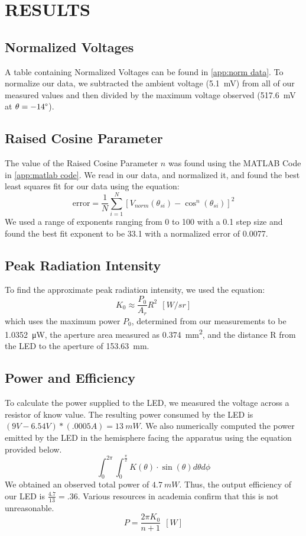 \section{RESULTS}

\subsection{Normalized Voltages}
A table containing Normalized Voltages can be found in \autoref{app:norm data}. To normalize our data, we subtracted the ambient voltage (\SI{5.1}{\milli\volt}) from all of our measured values and then divided by the maximum voltage observed (\SI{517.6}{\milli\volt} at $\theta = -14\degree$).
\subsection{Raised Cosine Parameter}
The value of the Raised Cosine Parameter $n$ was found using the MATLAB Code in \autoref{app:matlab code}. We read in our data, and normalized it, and found the best least squares fit for our data using the equation:
\[\text{error} = \frac{1}{N}\sum_{i=1}^{N}[V_{norm}(\theta_{si}) - \cos^{n}(\theta_{si})]^{2}\]
We used a range of exponents ranging from 0 to 100 with a 0.1 step size and found the best fit exponent to be 33.1 with a normalized error of 0.0077.

\subsection{Peak Radiation Intensity}
To find the approximate peak radiation intensity, we used the equation:
\[K_{0}\approx \frac{P_{0}}{A_{r}}R^{2}\: \: [W/sr]\]
which uses the maximum power $P_0$, determined from our measurements to be \SI{1.0352}{\micro\watt}, the aperture area measured as \SI{0.374}{mm^2}, and the distance R from the LED to the aperture of \SI{153.63}{mm}. 
\subsection{Power and Efficiency}
To calculate the power supplied to the LED, we measured the voltage across a resistor of know value. The resulting power consumed by the LED is $(9V - 6.54V)*(.0005A) = \SI{13}{mW}$. We also numerically computed the power emitted by the LED in the hemisphere facing the apparatus using the equation provided below.
\[\int_{0}^{2\pi}{\int_{0}^{\frac{\pi}{2}}K(\theta)\cdot \sin(\theta) d \theta d\phi}\]
We obtained an observed total power of $\SI{4.7}{mW}$.
Thus, the output efficiency of our LED is $\frac{4.7}{13} = .36$. Various resources in academia confirm that this is not unreasonable.
\[P = \frac{2 \pi K_{0}}{n+1}\: \: [W]\]

